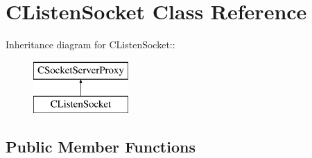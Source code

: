 \section{CListenSocket Class Reference}
\label{classCListenSocket}
Inheritance diagram for CListenSocket::\begin{figure}[H]
\begin{center}
\leavevmode
\includegraphics[height=2cm]{classCListenSocket}
\end{center}
\end{figure}
\subsection*{Public Member Functions}
